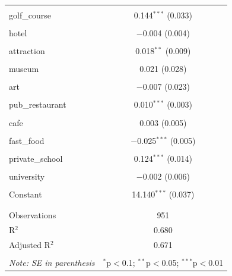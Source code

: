 \documentclass{article}
\begin{document}
\begin{table}[H]
\begin{tabular}{@{\extracolsep{-10pt}}lc}
  & \\ 
 golf\_course & 0.144$^{***}$ (0.033) \\ 
  & \\ 
 hotel & $-$0.004 (0.004) \\ 
  & \\ 
 attraction & 0.018$^{**}$ (0.009) \\ 
  & \\ 
 museum & 0.021 (0.028) \\ 
  & \\ 
 art & $-$0.007 (0.023) \\ 
  & \\ 
 pub\_restaurant & 0.010$^{***}$ (0.003) \\ 
  & \\ 
 cafe & 0.003 (0.005) \\ 
  & \\ 
 fast\_food & $-$0.025$^{***}$ (0.005) \\ 
  & \\ 
 private\_school & 0.124$^{***}$ (0.014) \\ 
  & \\ 
 university & $-$0.002 (0.006) \\ 
  & \\ 
 Constant & 14.140$^{***}$ (0.037) \\ 
  & \\ 
\hline \\[-1.8ex] 
Observations & 951 \\ 
R$^{2}$ & 0.680 \\ 
Adjusted R$^{2}$ & 0.671 \\ 
\hline 
\hline \\[-1.8ex] 
\textit{Note: SE in parenthesis}  & \multicolumn{1}{r}{$^{*}$p$<$0.1; $^{**}$p$<$0.05; $^{***}$p$<$0.01} \\ 
\end{tabular} 
\end{table} 
\end{document}
